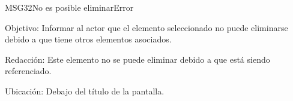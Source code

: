 \begin{mensaje}{MSG32}{No es posible eliminar}{Error}
	\item [Objetivo:] Informar al actor que el elemento seleccionado no puede eliminarse debido a que tiene otros elementos asociados.
	\item[Redacción:] Este elemento no se puede eliminar debido a que está siendo referenciado.
	\item [Ubicación:] Debajo del título de la pantalla.
\end{mensaje}